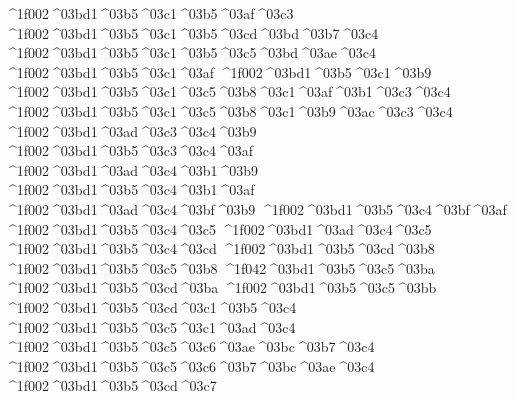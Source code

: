{^^^^1f002^^^^03bd1^^^^03b5^^^^03c1^^^^03b5^^^^03af^^^^03c3
^^^^1f002^^^^03bd1^^^^03b5^^^^03c1^^^^03b5^^^^03cd^^^^03bd^^^^03b7^^^^03c4 		%
^^^^1f002^^^^03bd1^^^^03b5^^^^03c1^^^^03b5^^^^03c5^^^^03bd^^^^03ae^^^^03c4
^^^^1f002^^^^03bd1^^^^03b5^^^^03c1^^^^03af   		%
^^^^1f002^^^^03bd1^^^^03b5^^^^03c1^^^^03b9
^^^^1f002^^^^03bd1^^^^03b5^^^^03c1^^^^03c5^^^^03b8^^^^03c1^^^^03af^^^^03b1^^^^03c3^^^^03c4   	%
^^^^1f002^^^^03bd1^^^^03b5^^^^03c1^^^^03c5^^^^03b8^^^^03c1^^^^03b9^^^^03ac^^^^03c3^^^^03c4
^^^^1f002^^^^03bd1^^^^03ad^^^^03c3^^^^03c4^^^^03b9  		%
^^^^1f002^^^^03bd1^^^^03b5^^^^03c3^^^^03c4^^^^03af
^^^^1f002^^^^03bd1^^^^03ad^^^^03c4^^^^03b1^^^^03b9  		%
^^^^1f002^^^^03bd1^^^^03b5^^^^03c4^^^^03b1^^^^03af
^^^^1f002^^^^03bd1^^^^03ad^^^^03c4^^^^03bf^^^^03b9  		%
^^^^1f002^^^^03bd1^^^^03b5^^^^03c4^^^^03bf^^^^03af
^^^^1f002^^^^03bd1^^^^03b5^^^^03c4^^^^03c5    		%
^^^^1f002^^^^03bd1^^^^03ad^^^^03c4^^^^03c5  		%
^^^^1f002^^^^03bd1^^^^03b5^^^^03c4^^^^03cd
^^^^1f002^^^^03bd1^^^^03b5^^^^03cd^^^^03b8   		%
^^^^1f002^^^^03bd1^^^^03b5^^^^03c5^^^^03b8
^^^^1f042^^^^03bd1^^^^03b5^^^^03c5^^^^03ba   		%
^^^^1f002^^^^03bd1^^^^03b5^^^^03cd^^^^03ba
^^^^1f002^^^^03bd1^^^^03b5^^^^03c5^^^^03bb    		%
^^^^1f002^^^^03bd1^^^^03b5^^^^03cd^^^^03c1^^^^03b5^^^^03c4 		%
^^^^1f002^^^^03bd1^^^^03b5^^^^03c5^^^^03c1^^^^03ad^^^^03c4
^^^^1f002^^^^03bd1^^^^03b5^^^^03c5^^^^03c6^^^^03ae^^^^03bc^^^^03b7^^^^03c4 		%
^^^^1f002^^^^03bd1^^^^03b5^^^^03c5^^^^03c6^^^^03b7^^^^03bc^^^^03ae^^^^03c4
 ^^^^1f002^^^^03bd1^^^^03b5^^^^03cd^^^^03c7   		%
}
